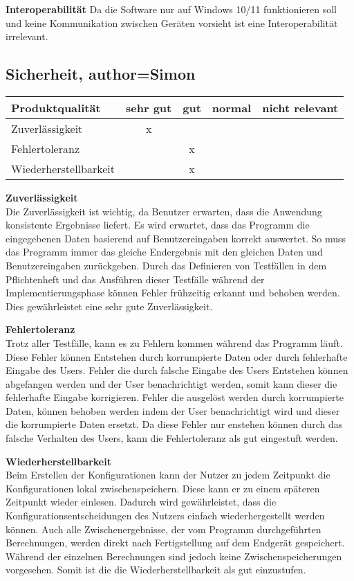 \documentclass[parskip=full]{scrartcl} %
\begin{document}
\textbf{Interoperabilität}
\newline
Da die Software nur auf Windows 10/11 funktionieren soll und keine Kommunikation zwischen Geräten vorsieht ist eine Interoperabilität irrelevant.




\subsection{Sicherheit, author=Simon}

    \begin{tabular}{|l| c| c| c| c|}
    \hline
        Produktqualität & sehr gut & gut & normal & nicht relevant \\
    \hline
        Zuverlässigkeit & x & & &\\
    \hline
        Fehlertoleranz & & x & &\\
    \hline
        Wiederherstellbarkeit & & x & &\\
    \hline
     \end{tabular}

\textbf{Zuverlässigkeit\\}
Die Zuverlässigkeit ist wichtig, da Benutzer erwarten, dass die Anwendung konsistente Ergebnisse liefert.
Es wird erwartet, dass das Programm die eingegebenen Daten basierend auf Benutzereingaben korrekt auswertet.
So muss das Programm immer das gleiche Endergebnis mit den gleichen Daten und Benutzereingaben zurückgeben.
Durch das Definieren von Testfällen in dem Pflichtenheft und das Ausführen dieser Testfälle während der Implementierungsphase können Fehler frühzeitig erkannt und behoben werden.
Dies gewährleistet eine sehr gute Zuverlässigkeit.

\textbf{Fehlertoleranz\\}
Trotz aller Testfälle, kann es zu Fehlern kommen während das Programm läuft. Diese Fehler können Entstehen durch korrumpierte Daten oder durch fehlerhafte Eingabe des Users.
Fehler die durch falsche Eingabe des Users Entstehen können abgefangen werden und der User benachrichtigt werden, somit kann dieser die fehlerhafte Eingabe korrigieren.
Fehler die ausgelöst werden durch korrumpierte Daten, können behoben werden indem der User benachrichtigt wird und dieser die korrumpierte Daten ersetzt.
Da diese Fehler nur enstehen können durch das falsche Verhalten des Users, kann 
die Fehlertoleranz als gut eingestuft werden.

\textbf{Wiederherstellbarkeit\\}
Beim Erstellen der Konfigurationen kann der Nutzer zu jedem Zeitpunkt die Konfigurationen lokal zwischenspeichern. Diese kann er zu einem späteren Zeitpunkt wieder einlesen. Dadurch wird gewährleistet, dass die Konfigurationsentscheidungen des Nutzers einfach wiederhergestellt werden können.
Auch alle Zwischenergebnisse, der vom Programm durchgeführten Berechnungen, werden direkt nach Fertigstellung auf dem Endgerät gespeichert. Während der einzelnen Berechnungen sind jedoch keine Zwischenspeicherungen vorgesehen.
Somit ist die die Wiederherstellbarkeit als gut einzustufen.
\end{document}
